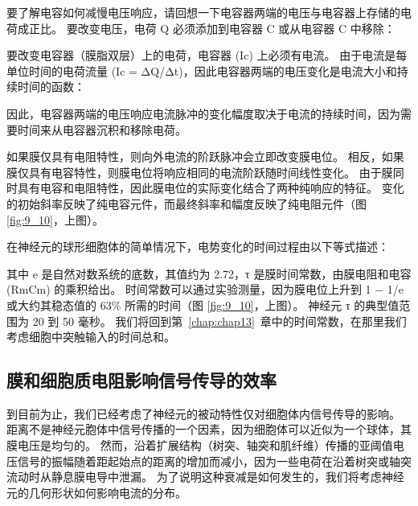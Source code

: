 要了解电容如何减慢电压响应，请回想一下电容器两端的电压与电容器上存储的电荷成正比。 
要改变电压，电荷 Q 必须添加到电容器 C 或从电容器 C 中移除：


要改变电容器（膜脂双层）上的电荷，电容器 (Ic) 上必须有电流。 
由于电流是每单位时间的电荷流量 (Ic = ΔQ/Δt)，因此电容器两端的电压变化是电流大小和持续时间的函数：


因此，电容器两端的电压响应电流脉冲的变化幅度取决于电流的持续时间，因为需要时间来从电容器沉积和移除电荷。


如果膜仅具有电阻特性，则向外电流的阶跃脉冲会立即改变膜电位。 
相反，如果膜仅具有电容特性，则膜电位将响应相同的电流阶跃随时间线性变化。 
由于膜同时具有电容和电阻特性，因此膜电位的实际变化结合了两种纯响应的特征。 
变化的初始斜率反映了纯电容元件，而最终斜率和幅度反映了纯电阻元件（图 \ref{fig:9_10}，上图）。


在神经元的球形细胞体的简单情况下，电势变化的时间过程由以下等式描述：


其中 e 是自然对数系统的底数，其值约为 2.72，τ 是膜时间常数，由膜电阻和电容 (RmCm) 的乘积给出。
时间常数可以通过实验测量，因为膜电位上升到 1 − 1/e 或大约其稳态值的 63\% 所需的时间（图 \ref{fig:9_10}，上图）。 
神经元 τ 的典型值范围为 20 到 50 毫秒。 我们将回到第~\ref{chap:chap13}~章中的时间常数，在那里我们考虑细胞中突触输入的时间总和。



\subsection{膜和细胞质电阻影响信号传导的效率}

到目前为止，我们已经考虑了神经元的被动特性仅对细胞体内信号传导的影响。
距离不是神经元胞体中信号传播的一个因素，因为细胞体可以近似为一个球体，其膜电压是均匀的。
然而，沿着扩展结构（树突、轴突和肌纤维）传播的亚阈值电压信号的振幅随着距起始点的距离的增加而减小，因为一些电荷在沿着树突或轴突流动时从静息膜电导中泄漏。
为了说明这种衰减是如何发生的，我们将考虑神经元的几何形状如何影响电流的分布。


